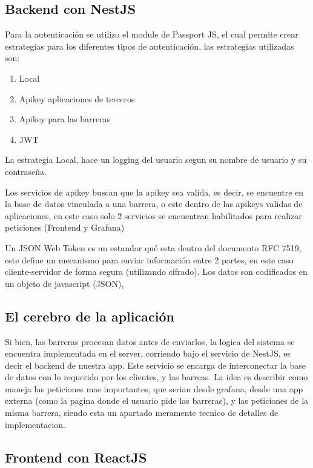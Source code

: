 \subsection{Backend con NestJS}


Para la autenticación se utilizo el module de Passport JS, el cual permite crear estrategias para los diferentes tipos de autenticación, las estrategias utilizadas son:

\begin{enumerate}
        \item Local
        \item Apikey aplicaciones de terceros
        \item Apikey para las barreras
        \item JWT
\end{enumerate}

La estrategia Local, hace un logging del usuario segun su nombre de usuario y su contraseña.

Los servicios de apikey buscan que la apikey sea valida, es decir, se encuentre en la base de datos vinculada a una barrera, o este dentro de las apikeys validas de aplicaciones, en este caso solo 2 servicios se encuentran habilitados para realizar peticiones (Frontend y Grafana)

Un JSON Web Token es un estandar qué esta dentro del documento RFC 7519, este define un mecanismo para enviar información entre 2 partes, en este caso cliente-servidor de forma segura (utilizando cifrado). Los datos son codificados en un objeto de javascript (JSON),

\subsection{El cerebro de la aplicación}

Si bien, las barreras procesan datos antes de enviarlos, la logica del sistema se encuentra implementada en el server, corriendo bajo el servicio de NestJS, es decir el backend de nuestra app. Este servicio se encarga de interconectar la base de datos con lo requerido por los clientes, y las barreas. La idea es describir como maneja las peticiones mas importantes, que serian desde grafana, desde una app externa (como la pagina donde el usuario pide las barreras), y las peticiones de la misma barrera, siendo esta un apartado meramente tecnico de detalles de implementacion.


\subsection{Frontend con ReactJS}

